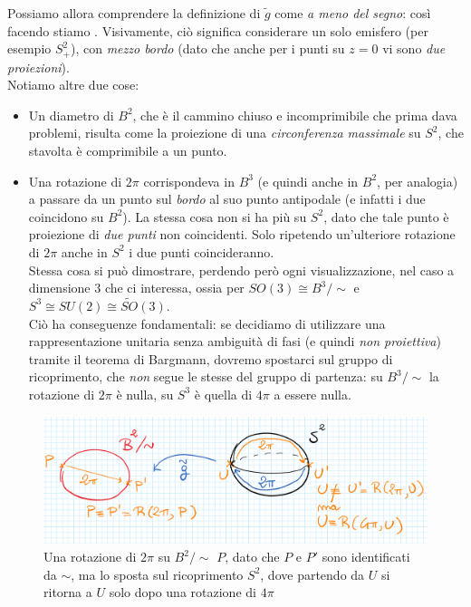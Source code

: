 \documentclass[../../FisicaTeorica.tex]{subfiles}
\begin{document}
Possiamo allora comprendere la definizione di $\tilde{g}$ come \textit{a meno del segno}: così facendo stiamo . Visivamente, ciò significa considerare un solo emisfero (per esempio $S^2_+$), con \textit{mezzo bordo} (dato che anche per i punti su $z=0$ vi sono \textit{due proiezioni}).\\
Notiamo altre due cose:
\begin{itemize}
\item Un diametro di $B^2$, che è il cammino chiuso e incomprimibile che prima dava problemi, risulta come la proiezione di una \textit{circonferenza massimale} su $S^2$, che stavolta è comprimibile a un punto.
\item Una rotazione di $2\pi$ corrispondeva in $B^3$ (e quindi anche in $B^2$, per analogia) a passare da un punto sul \textit{bordo} al suo punto antipodale (e infatti i due coincidono su $B^2$). La stessa cosa non si ha più su $S^2$, dato che tale punto è proiezione di \textit{due punti} non coincidenti. Solo ripetendo un'ulteriore rotazione di $2\pi$ anche in $S^2$ i due punti coincideranno.\\
Stessa cosa si può dimostrare, perdendo però ogni visualizzazione, nel caso a dimensione $3$ che ci interessa, ossia per $SO(3)\cong B^3/\sim$ e $S^3 \cong SU(2) \cong \widetilde{SO}(3)$.\\
Ciò ha conseguenze fondamentali: se decidiamo di utilizzare una rappresentazione unitaria senza ambiguità di fasi (e quindi \textit{non proiettiva}) tramite il teorema di Bargmann, dovremo spostarci sul gruppo di ricoprimento, che \textit{non} segue le stesse  del gruppo di partenza: su $B^3/\sim$ la rotazione di $2\pi$ è nulla, su $S^3$ è quella di $4\pi$ a essere nulla.
\end{itemize}
\begin{figure}[H]
\centering
\includegraphics[scale=0.2]{Immagini/23_11/image004.png}
\caption{Una rotazione di $2\pi$ su $B^2/\sim$  $P$, dato che $P$ e $P'$ sono identificati da $\sim$, ma lo sposta sul ricoprimento $S^2$, dove partendo da $U$ si ritorna a $U$ solo dopo una rotazione di $4\pi$}
\end{figure}
\end{document}
